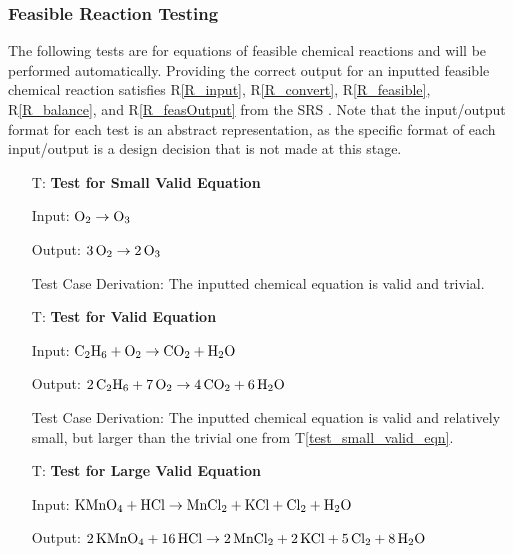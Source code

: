 \documentclass[12pt, titlepage]{article}
\newcounter{testnum} %
\newcommand{\testref}[1]{T\ref{#1}}
\newcommand{\rref}[1]{R\ref{#1}}
\begin{document}
\subsubsection{Feasible Reaction Testing}

The following tests are for equations of feasible chemical reactions and
will be performed automatically. Providing the correct output for an inputted
feasible chemical reaction satisfies \rref{R_input}, \rref{R_convert},
\rref{R_feasible}, \rref{R_balance}, and \rref{R_feasOutput} from the SRS
\cite{srs}. Note that the input/output format
for each test is an abstract representation, as the specific format of each
input/output is a design decision that is not made at this stage.

\begin{enumerate}

  \item[T\refstepcounter{testnum}\thetestnum \label{test_small_valid_eqn}:]
    \textbf{Test for Small Valid Equation}

    Input: $\ce{O2} \rightarrow \ce{O3}$ \cite{fahey_twenty_2011}

    Output: $\ce{3O2} \rightarrow \ce{2O3}$ \cite[p.~6]{fahey_twenty_2011}

    Test Case Derivation: The inputted chemical equation is
    valid and trivial.

  \item[T\refstepcounter{testnum}\thetestnum \label{test_valid_eqn}:]
    \textbf{Test for Valid Equation}

    Input: $\ce{C2H6} + \ce{O2} \rightarrow \ce{CO2} + \ce{H2O}$
    \cite{hamid_balancing_2019}

    Output: $\ce{2C2H6} + \ce{7O2} \rightarrow \ce{4CO2} + \ce{6H2O}$
    \cite[p.~523]{hamid_balancing_2019}

    Test Case Derivation: The inputted chemical equation is valid and
    relatively small, but larger than the trivial one from
    \testref{test_small_valid_eqn}.

  \item[T\refstepcounter{testnum}\thetestnum \label{test_large_valid_eqn}:]
    \textbf{Test for Large Valid Equation}

    Input: $\ce{KMnO4} + \ce{HCl} \rightarrow \ce{MnCl2} + \ce{KCl} +
      \ce{Cl2} + \ce{H2O}$ \cite{taylor_balancing_2021}

    Output: $\ce{2KMnO4} + \ce{16HCl} \rightarrow \ce{2MnCl2} + \ce{2KCl} +
      \ce{5Cl2} + \ce{8H2O}$ \cite{taylor_balancing_2021}


\end{enumerate}
\end{document}

